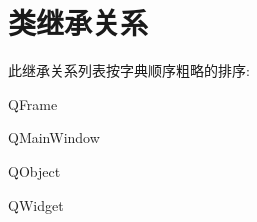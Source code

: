 \section{类继承关系}
此继承关系列表按字典顺序粗略的排序\+: \begin{DoxyCompactList}
\item Q\+Frame\begin{DoxyCompactList}
\item {}
\end{DoxyCompactList}
\item Q\+Main\+Window\begin{DoxyCompactList}
\item {}
\end{DoxyCompactList}
\item Q\+Object\begin{DoxyCompactList}
\item {}
\item {}
\end{DoxyCompactList}
\item Q\+Widget\begin{DoxyCompactList}
\item {}
\end{DoxyCompactList}
\end{DoxyCompactList}
